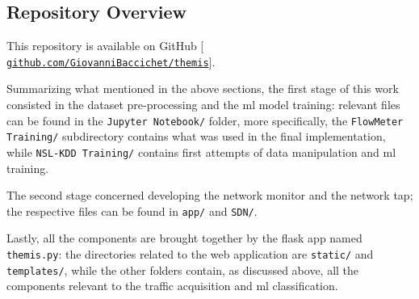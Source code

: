 


\newpage

\subsection{Repository Overview}
\label{subsec:repository}

This repository is available on GitHub [{\fontsize{7}{7}\faExternalLink*[regular]} \href{https://github.com/GiovanniBaccichet/themis/}{\texttt{github.com/GiovanniBaccichet/themis}}].
\par Summarizing what mentioned in the above sections, the first stage of this work consisted in the dataset pre-processing and the \gls{ml} model training: relevant files can be found in the \texttt{Jupyter Notebook/} folder, more specifically, the \texttt{FlowMeter Training/} subdirectory contains what was used in the final implementation, while \texttt{NSL-KDD Training/} contains first attempts of data manipulation and \gls{ml} training.
\par The second stage concerned developing the network monitor and the network \gls{tap}; the respective files can be found in \texttt{app/} and \texttt{SDN/}.
\par Lastly, all the components are brought together by the flask app named \texttt{themis.py}: the directories related to the web application are \texttt{static/} and \texttt{templates/}, while the other folders contain, as discussed above, all the components relevant to the traffic acquisition and \gls{ml} classification. 

